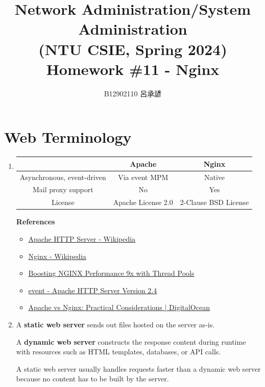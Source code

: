 \documentclass[12pt, a4paper]{article}
\title{
  \vspace{-1cm}
  Network Administration/System Administration\\
  (NTU CSIE, Spring 2024)\\
  Homework \#11 - Nginx
}
\author{\Large B12902110 呂承諺}
\begin{document}
  \maketitle

  \section*{Web Terminology}
  \begin{enumerate}
    \item \phantom{}\vspace{-\baselineskip}

    \begin{tabular}{|c|c|c|}
      \hline
      & \textbf{Apache} & \textbf{Nginx} \\\hline
      Asynchronous, event-driven & Via event MPM & Native \\\hline
      Mail proxy support & No & Yes \\\hline
      License & Apache License 2.0 & 2-Clause BSD License \\\hline
    \end{tabular}
    \vspace{\baselineskip}

    \textbf{References}
    \begin{itemize}
      \item \href{https://en.wikipedia.org/wiki/Apache_HTTP_Server}{Apache HTTP Server - Wikipedia}
      \item \href{https://en.wikipedia.org/wiki/Nginx}{Nginx - Wikipedia}
      \item \href{https://www.nginx.com/blog/thread-pools-boost-performance-9x/}{Boosting NGINX Performance 9x with Thread Pools}
      \item \href{https://httpd.apache.org/docs/2.4/mod/event.html}{event - Apache HTTP Server Version 2.4}
      \item \href{https://www.digitalocean.com/community/tutorials/apache-vs-nginx-practical-considerations}{Apache vs Nginx: Practical Considerations  | DigitalOcean}
    \end{itemize}

    \item A \textbf{static web server} sends out files hosted on the server as-is.

    A \textbf{dynamic web server} constructs the response content during runtime with
    resources such as HTML templates, databases, or API calls.

    A static web server usually handles requests faster than a dynamic web server
    because no content has to be built by the server.


\end{enumerate}
\end{document}
